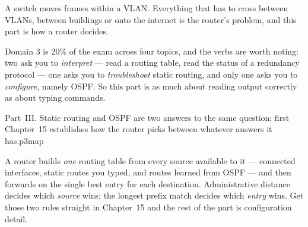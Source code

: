 
\vspace*{0.4cm}
A switch moves frames within a VLAN. Everything that has to cross between VLANs,
between buildings or onto the internet is the router's problem, and this part is
how a router decides.

Domain 3 is 20\% of the exam across four topics, and the verbs are worth noting:
two ask you to \emph{interpret} --- read a routing table, read the status of a
redundancy protocol --- one asks you to \emph{troubleshoot} static routing, and
only one asks you to \emph{configure}, namely OSPF. So this part is as much about
reading output correctly as about typing commands.

%
{Part~III. Static routing and OSPF are two answers to the same question; first
Chapter~15 establishes how the router picks between whatever answers it has.}{p3map}

\begin{examnote}
A router builds \emph{one} routing table from every source available to it ---
connected interfaces, static routes you typed, and routes learned from OSPF ---
and then forwards on the single best entry for each destination. Administrative
distance decides which \emph{source} wins; the longest prefix match decides which
\emph{entry} wins. Get those two rules straight in Chapter~15 and the rest of the
part is configuration detail.
\end{examnote}
